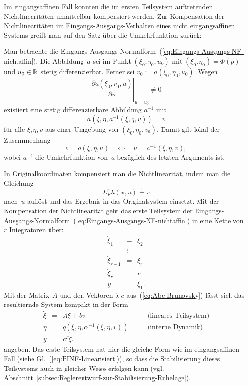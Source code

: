 Im eingangsaffinen Fall konnten die im ersten Teilsystem auftretenden
Nichtlinearitäten unmittelbar kompensiert werden. Zur Kompensation
der Nichtlinearitäten im Eingangs-Ausgangs-Verhalten eines nicht eingangsaffinen
Systems greift man auf den Satz über die Umkehrfunktion zurück:
\begin{remark}
Man betrachte die Eingangs-Ausgangs-Normal\-form~(\ref{eq:Eingangs-Ausgangs-NF-nichtaffin}).
Die Abbildung~$a$ sei im Punkt $(\xi_{0},\eta_{0},u_{0})$ mit $(\xi_{0},\eta_{0})=\Phi(p)$
und $u_{0}\in{\mathbb{R}}$ stetig differenzierbar. Ferner sei $v_{0}:=a(\xi_{0},\eta_{0},u_{0})$.
Wegen
\[
\left.\frac{\partial a(\xi_{0},\eta_{0},u)}{\partial u}\right|_{u=u_{0}}\neq0
\]
existiert eine stetig differenzierbare Abbildung $a^{-1}$ mit 
\[
a(\xi,\eta,a^{-1}(\xi,\eta,v))=v
\]
für alle $\xi,\eta,v$ aus einer Umgebung von $(\xi_{0},\eta_{0},v_{0})$.
Damit gilt lokal der Zusammenhang 
\[
v=a(\xi,\eta,u)\quad\Leftrightarrow\quad u=a^{-1}(\xi,\eta,v),
\]
wobei $a^{-1}$ die Umkehrfunktion von~$a$ bezüglich des letzten
Arguments ist. 
\end{remark}

In Originalkoordinaten kompensiert man die Nichtlinearität, indem
man die Gleichung 
\begin{equation}
L_{F}^{r}h(x,u)\stackrel{!}{=}v\label{eq:Forderung-E-A-Linearisierung-nichtaffin}
\end{equation}
nach~$u$ auflöst und das Ergebnis in das Originalsystem einsetzt.
Mit der Kompensation der Nichtlinearität geht das erste Teilsystem
der Eingangs-Ausgangs-Normalform~(\ref{eq:Eingangs-Ausgangs-NF-nichtaffin})
in eine Kette von $r$ Integratoren über: 
\[
\begin{array}{lcl}
\dot{\xi}_{1} & = & \xi_{2}\\
 & \vdots\\
\dot{\xi}_{r-1} & = & \xi_{r}\\
\dot{\xi}_{r} & = & v\\
y & = & \xi_{1}.
\end{array}
\]
Mit der Matrix~$A$ und den Vektoren $b,c$ aus~(\ref{eq:Abc-Brunovsky})
lässt sich das resultiernde System kompakt in der Form
\begin{equation}
\begin{array}{rcll}
\dot{\xi} & = & A\xi+bv\qquad & \text{(lineares Teilsystem)}\\
\dot{\eta} & = & q(\xi,\eta,\alpha^{-1}(\xi,\eta,v))\qquad & \text{(interne Dynamik)}\\
y & = & c^{T}\xi.
\end{array}\label{eq:EA-NF-nichtaffin-Linearisiert}
\end{equation}
angeben. Das erste Teilsystem hat hier die gleiche Form wie im eingangsaffinen
Fall (siehe Gl.~(\ref{eq:BINF-Linearisiert})), so dass die Stabilisierung
dieses Teilsystems auch in gleicher Weise erfolgen kann (vgl. Abschnitt~\ref{subsec:Reglerentwurf-zur-Stabilisierung-Ruhelage}).

